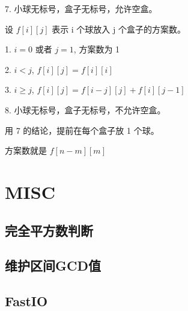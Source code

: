 \documentclass[a4paper]{article}
\begin{document}
7. 小球无标号，盒子无标号，允许空盒。

   设 $f[i][j]$ 表示 i 个球放入 j 个盒子的方案数。

   1. $i = 0$ 或者 $j = 1$, 方案数为 1

   2. $i < j$, $f[i][j]=f[i][i]$

   3. $i\ge j$, $f[i][j]=f[i-j][j]+f[i][j-1]$

8. 小球无标号，盒子无标号，不允许空盒。

   用 7 的结论，提前在每个盒子放 1 个球。

   方案数就是 $f[n-m][m]$
\section{MISC}
\subsection{完全平方数判断}

\subsection{维护区间GCD值}

\subsection{FastIO}

\end{document}
